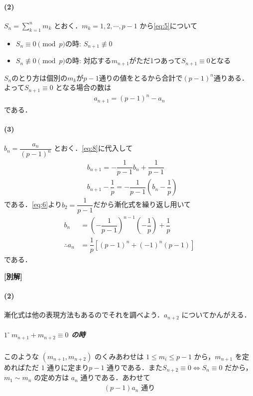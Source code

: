 \documentclass[../../main.tex]{subfiles}
\begin{document}
\paragraph{(2)}

$S_n = \sum_{k=1}^n m_k$ とおく．$m_k = 1, 2, \cdots, p-1$ から\cref{eq:5}について
\begin{itemize}
  \item $S_n \equiv 0 \pmod p$の時: $S_{n+1} \not\equiv 0$ \\
  \item $S_n \not\equiv 0 \pmod p$の時: 対応する$m_{n+1}$がただ1つあって$S_{n+1}\equiv 0$となる
\end{itemize}
$S_n$のとり方は個別の$m_k$が$p-1$通りの値をとるから合計で$(p-1)^n$通りある．
よって$S_{n+1} \equiv 0$ となる場合の数は
\begin{align}
  a_{n+1} = (p-1)^n - a_n \label{eq:8}
\end{align}
である．

\paragraph{(3)}

$b_n = \dfrac{a_n}{(p-1)^n}$ とおく．\cref{eq:8}に代入して
\begin{align}
  & b_{n+1} = -\dfrac{1}{p-1} b_n + \dfrac{1}{p-1} \\
  & b_{n+1} - \dfrac{1}{p} = -\dfrac{1}{p-1} \left(b_n - \dfrac{1}{p}\right)
\end{align}
である．\cref{eq:6}より$b_2=\dfrac{1}{p-1}$だから漸化式を繰り返し用いて
\begin{align}
  b_n &= \left(-\dfrac{1}{p-1}\right)^{n-1} \left(-\dfrac{1}{p}\right) + \dfrac{1}{p} \\
  \therefore
  a_n &= \dfrac{1}{p} \left[ (p-1)^n + (-1)^n (p-1) \right]
\end{align}
である．

{\bf [別解]}
\paragraph{(2)}
漸化式は他の表現方法もあるのでそれを調べよう．$a_{n+2}$ についてかんがえる．

\subparagraph{$1^\circ\ m_{n+1} + m_{n+2} \equiv 0$ の時}

このような $(m_{n+1}, m_{n+2})$ のくみあわせは $1 \le m_i \le p-1$ から，$m_{n+1}$ を定めればただ $1$ 通りに定まり$p-1$ 通りである．また$S_{n+2} \equiv 0 \iff S_n \equiv 0$ だから，$m_1 \sim m_n$ の定め方は $a_n$ 通りである．あわせて
\begin{align}
  (p-1) a_n \text{ 通り}
\end{align}
\end{document}
